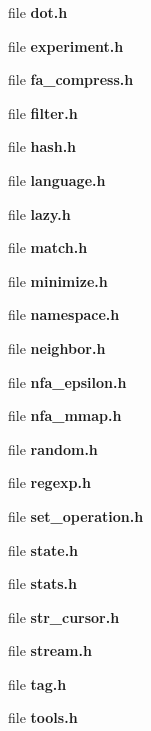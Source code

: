 \begin{DoxyCompactItemize}
file {\bfseries dot.\+h}
\item 
file {\bfseries experiment.\+h}
\item 
file {\bfseries fa\+\_\+compress.\+h}
\item 
file {\bfseries filter.\+h}
\item 
file {\bfseries hash.\+h}
\item 
file {\bfseries language.\+h}
\item 
file {\bfseries lazy.\+h}
\item 
file {\bf match.\+h}
\item 
file {\bfseries minimize.\+h}
\item 
file {\bfseries namespace.\+h}
\item 
file {\bfseries neighbor.\+h}
\item 
file {\bfseries nfa\+\_\+epsilon.\+h}
\item 
file {\bfseries nfa\+\_\+mmap.\+h}
\item 
file {\bfseries random.\+h}
\item 
file {\bfseries regexp.\+h}
\item 
file {\bfseries set\+\_\+operation.\+h}
\item 
file {\bfseries state.\+h}
\item 
file {\bfseries stats.\+h}
\item 
file {\bfseries str\+\_\+cursor.\+h}
\item 
file {\bfseries stream.\+h}
\item 
file {\bfseries tag.\+h}
\item 
file {\bfseries tools.\+h}
\end{DoxyCompactItemize}
